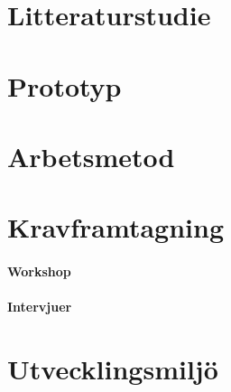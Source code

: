 
 
\section{Litteraturstudie}

\section{Prototyp}

\section{Arbetsmetod}

\section{Kravframtagning}

\paragraph{Workshop}


\paragraph{Intervjuer}



\section{Utvecklingsmiljö}


